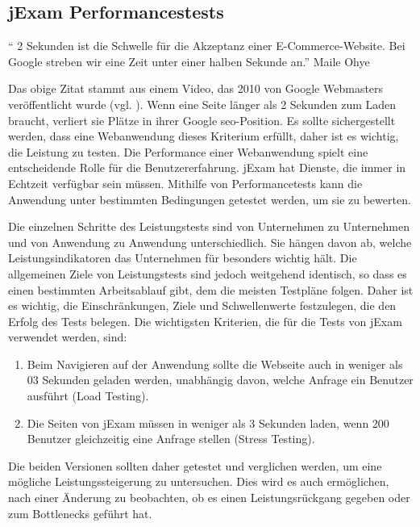 \subsection{jExam Performancestests}\label{ch:perform}

\begin{center}
`` 2 Sekunden ist die Schwelle f\"ur die Akzeptanz einer E-Commerce-Website.
Bei Google streben wir eine Zeit unter einer halben Sekunde an.'' Maile Ohye
\end{center}
\>

Das obige Zitat stammt aus einem Video, das 2010 von Google Webmasters
ver\"offentlicht wurde (vgl. \cite{Ohye2010}). Wenn eine Seite l\"anger
als 2 Sekunden zum Laden braucht, verliert sie Pl\"atze in ihrer Google
\acs{seo}-Position. Es sollte sichergestellt werden, dass eine
Webanwendung dieses Kriterium erfüllt, daher ist es wichtig,
die Leistung zu testen. Die Performance einer Webanwendung spielt eine
entscheidende Rolle f\"ur die Benutzererfahrung. jExam hat Dienste,
die immer in Echtzeit verf\"ugbar sein m\"ussen. Mithilfe von 
Performancetests kann die Anwendung unter bestimmten Bedingungen 
getestet werden, um sie zu bewerten.

Die einzelnen Schritte des Leistungstests sind von Unternehmen
zu Unternehmen und von Anwendung zu Anwendung unterschiedlich.
Sie hängen davon ab, welche Leistungsindikatoren das Unternehmen für
besonders wichtig hält. Die allgemeinen Ziele von Leistungstests
sind jedoch weitgehend identisch, so dass es einen bestimmten
Arbeitsablauf gibt, dem die meisten Testpläne folgen. Daher ist es
wichtig, die Einschränkungen, Ziele und Schwellenwerte festzulegen,
die den Erfolg des Tests belegen. Die wichtigsten Kriterien,
die für die Tests von jExam verwendet werden, sind:

\noindent
\begin{enumerate}
    \item Beim Navigieren auf der Anwendung sollte die Webseite auch in
    weniger als 03 Sekunden geladen werden, unabhängig davon, welche Anfrage
    ein Benutzer ausführt (Load Testing).
    \item Die Seiten von jExam müssen in weniger als 3 Sekunden laden,
    wenn 200 Benutzer gleichzeitig eine Anfrage stellen (Stress Testing).
\end{enumerate}

Die beiden Versionen sollten daher getestet und verglichen werden,
um eine mögliche Leistungssteigerung zu untersuchen.
Dies wird es auch ermöglichen, nach einer \"Anderung zu beobachten, ob
es einen Leistungsrückgang gegeben oder zum Bottlenecks geführt hat.